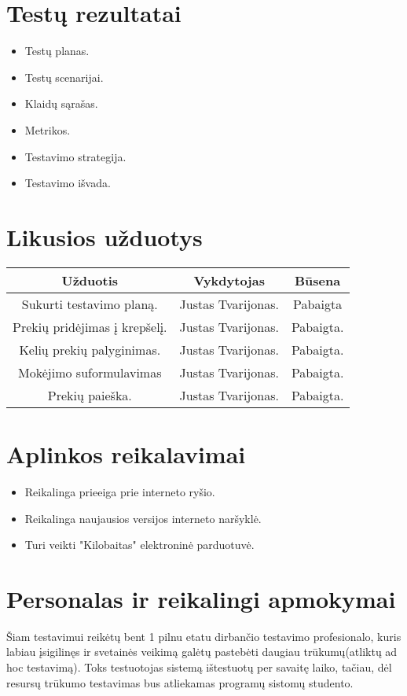 \documentclass{VUMIFPSkursinis}
\begin{document}
\vspace{1cm}
\section{Testų rezultatai}
\begin{itemize}
	\item Testų planas.
	\item Testų scenarijai.
	\item Klaidų sąrašas.
	\item Metrikos.
	\item Testavimo strategija.
	\item Testavimo išvada.
\end{itemize}
\vspace{1cm}
\section{Likusios užduotys}

\begin{center}
\begin{tabular}{ |c|c|c| } 
 \hline
 Užduotis & Vykdytojas & Būsena \\ \hline
 Sukurti testavimo planą. & Justas Tvarijonas. & Pabaigta \\ \hline
 Prekių pridėjimas į krepšelį.  & Justas Tvarijonas. & Pabaigta. \\ \hline
 Kelių prekių palyginimas. & Justas Tvarijonas. & Pabaigta. \\ \hline
 Mokėjimo suformulavimas & Justas Tvarijonas. & Pabaigta. \\ \hline
 Prekių paieška. & Justas Tvarijonas. & Pabaigta. \\ \hline
\end{tabular}
\end{center}
\vspace{1cm}
\section{Aplinkos reikalavimai}
\begin{itemize}
	\item Reikalinga prieeiga prie interneto ryšio.
	\item Reikalinga naujausios versijos interneto naršyklė.
	\item Turi veikti "Kilobaitas" elektroninė parduotuvė.
\end{itemize}
\vspace{1cm}
\section{Personalas ir reikalingi apmokymai}
Šiam testavimui reikėtų bent 1 pilnu etatu dirbančio testavimo profesionalo, kuris labiau įsigilinęs ir svetainės veikimą galėtų pastebėti daugiau trūkumų(atliktų ad hoc testavimą). Toks testuotojas sistemą ištestuotų per savaitę laiko, tačiau, dėl resursų trūkumo testavimas bus atliekamas programų sistomų studento.
\vspace{1cm}
\end{document}
